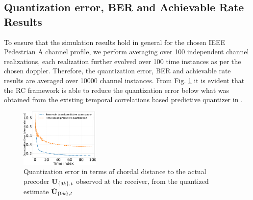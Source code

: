 \documentclass[conference]{IEEEtran}
\begin{document}
{\subsection{Quantization error, BER and Achievable Rate Results}
\label{res}{}
\noindent To ensure that the simulation results hold in general for the chosen IEEE Pedestrian A channel profile, we perform averaging over 100 independent channel realizations, each realization further evolved over 100 time instances as per the chosen doppler. Therefore, the quantization error, BER and achievable rate results are averaged over 10000 channel instances. From Fig. \ref{qtiz_err} it is evident that the RC framework is able to reduce the quantization error below what was obtained from the existing temporal correlations based predictive quantizer in \cite{6891198}. 
\begin{figure}
\centering
\includegraphics[width=0.35\textwidth]{images/qtizErr.pdf}
\caption{Quantization error in terms of chordal distance to the actual precoder ${\bf U}_{\{9k\},t}$ observed at the receiver, from the quantized estimate $\tilde{{\bf U}}_{\{9k\},t}$}
\label{qtiz_err}
\end{figure}

}
\end{document}
